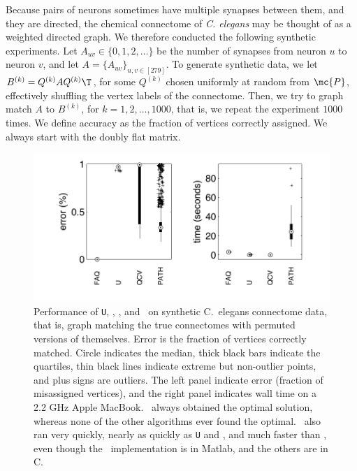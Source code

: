 \documentclass{article} %
\begin{document}
Because pairs of neurons sometimes have multiple synapses between them, and they are directed, the chemical connectome of \emph{C. elegans} may be thought of as a weighted directed graph.
We therefore conducted the following synthetic experiments.  
Let $A_{uv} \in \{0,1,2,\ldots\}$ be the number of synapses from neuron $u$ to neuron $v$, and let $A=\{A_{uv}\}_{u,v \in [279]}$.  To generate synthetic data, we let $B^{(k)}=Q^{(k)} A {Q^{(k)}}\T$, for some $Q^{(k)}$ chosen uniformly at random from $\mc{P}$, effectively shuffling the vertex labels of the connectome.  Then, we try to graph match $A$ to $B^{(k)}$, for  $k =1,2,\ldots, 1000$, that is, we repeat the experiment $1000$ times.  We define accuracy as the fraction of vertices correctly assigned. We always start with the doubly flat matrix.


\begin{figure}[h!]
	\centering
		\includegraphics[width=0.5\linewidth]{../figs/chemicalConnectome.pdf}
	\caption{Performance of \texttt{U}, \Qcv, \Path, and \FAQ\  on synthetic C.~elegans connectome data, that is, graph matching the true connectomes with permuted versions of themselves.  Error is the fraction of vertices correctly matched.  Circle indicates the median, thick black bars indicate the quartiles, thin black lines indicate extreme but non-outlier points, and plus signs are outliers. The left panel indicate error (fraction of misassigned vertices), and the right panel indicates wall time on a 2.2 GHz Apple MacBook.   \FAQ\  always obtained the optimal solution, whereas none of the other algorithms ever found the optimal.    \FAQ\  also ran very quickly, nearly as quickly as \texttt{U} and \Qcv, and much faster than \Path, even though the \FAQ\  implementation is in Matlab, and the others are in C.}
	\label{fig:connectomes}
\end{figure}
\end{document}
